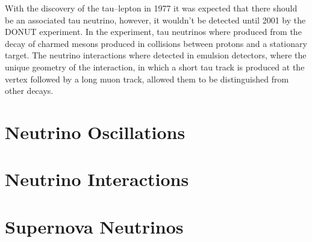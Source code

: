 With the discovery of the tau--lepton in 1977 it was expected that there should 
be an associated tau neutrino, however, it wouldn't be detected until 2001 by 
the DONUT experiment. In the experiment, tau neutrinos where produced from the
decay of charmed mesons produced in collisions between protons and a stationary
target. The neutrino interactions where detected in emulsion detectors, where
the unique geometry of the interaction, in which a short tau track is produced
at the vertex followed by a long muon track, allowed them to be distinguished 
from other decays.




\section{Neutrino Oscillations} \label{nu_osc}

\section{Neutrino Interactions} \label{nu_prod}

\section{Supernova Neutrinos} \label{nu_sn}
